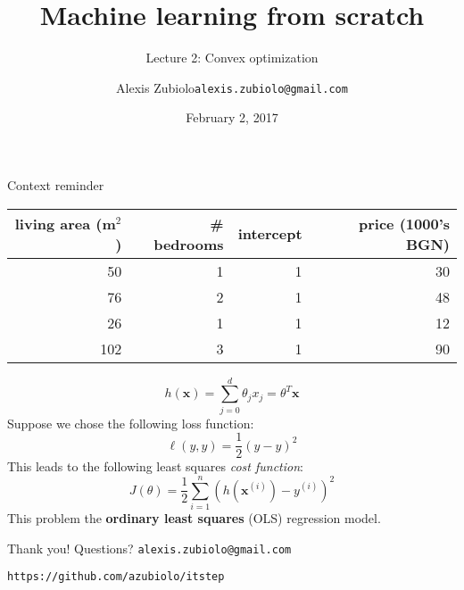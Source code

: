 \documentclass{beamer}
\title[Course presentation]{Machine learning from scratch}
\subtitle{Lecture 2: Convex optimization}
\author{Alexis Zubiolo\newline\texttt{alexis.zubiolo@gmail.com}}
\institute{Data Science Team Lead @ Adcash}
\date{February 2, 2017}
\newcommand{\yhat}{\hat{y}}
\newcommand{\bxi}{\bm{x}^{(i)}}
\newcommand{\bx}{\bm{x}}
\newcommand{\yi}{y^{(i)}}
\newcommand{\1}[1]{\mathbbm{1}\left[#1\right]}
\begin{document}
\begin{frame}
  \titlepage
\end{frame}

\begin{frame}{Context reminder}
\begin{table}
\centering
\begin{tabular}{r|r|r|r}
living area (m$^2$) & \# bedrooms & intercept & price (1000's BGN) \\\hline
50 & 1 & 1 & 30\\
76 & 2 & 1 & 48\\
26 & 1 & 1 & 12\\
102 & 3 & 1 & 90\\
\end{tabular}
\end{table}
\vfill
\begin{equation*}
h(\bx) = \sum_{j = 0}^{d} \theta_j x_j = \theta^T \bx
\end{equation*}
\pause
\vfill
Suppose we chose the following loss function:
\begin{equation*}
\ell \left( y, \yhat \right) = \dfrac{1}{2} \left( y - \yhat \right)^2
\end{equation*}
This leads to the following least squares \textit{cost function}:
\begin{equation*}
J(\theta) = \dfrac{1}{2} \sum_{i = 1}^{n} \left( h\left(\bxi\right) - \yi \right)^2
\end{equation*}
This problem the \textbf{ordinary least squares} (OLS) regression model.
\end{frame}

\begin{frame}
\vfill
\centering
\begin{huge}
\huge{Thank you! Questions?}
\vfill
\texttt{alexis.zubiolo@gmail.com}
\end{huge}
\vfill
\begin{Large}
\texttt{https://github.com/azubiolo/itstep}
\end{Large}
\vfill
\end{frame}
\end{document}
